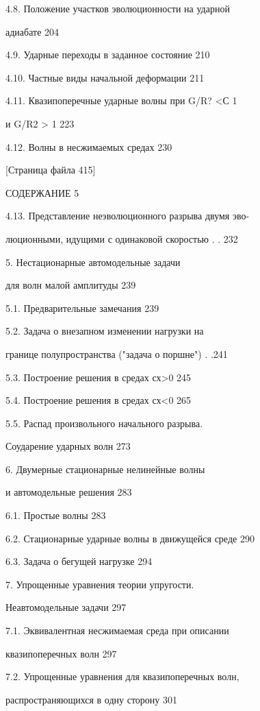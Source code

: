 \documentclass[
  11pt,
]{article}
\begin{document}
4.8. Положение участков эволюционности на ударной \par
адиабате 204 \par
4.9. Ударные переходы в заданное состояние 210 \par
4.10. Частные виды начальной деформации 211 \par
4.11. Квазипоперечные ударные волны при G/R? \textless С 1 \par
и G/R2 \textgreater{} 1 223 \par
4.12. Волны в несжимаемых средах 230 \par
\smallskip
\smallskip
\smallskip
{[}Страница файла 415{]}\par
СОДЕРЖАНИЕ 5 \par
4.13. Представление неэволюционного разрыва двумя эво- \par
люционными, идущими с одинаковой скоростью . . 232 \par
5. Нестационарные автомодельные задачи \par
для волн малой амплитуды 239 \par
5.1. Предварительные замечания 239 \par
5.2. Задача о внезапном изменении нагрузки на \par
границе полупространства ("задача о поршне") . .241 \par
5.3. Построение решения в средах сх\textgreater0 245 \par
5.4. Построение решения в средах сх\textless0 265 \par
5.5. Распад произвольного начального разрыва. \par
Соударение ударных волн 273 \par
6. Двумерные стационарные нелинейные волны \par
и автомодельные решения 283 \par
6.1. Простые волны 283 \par
6.2. Стационарные ударные волны в движущейся среде 290 \par
6.3. Задача о бегущей нагрузке 294 \par
7. Упрощенные уравнения теории упругости. \par
Неавтомодельные задачи 297 \par
7.1. Эквивалентная несжимаемая среда при описании \par
квазипоперечных волн 297 \par
7.2. Упрощенные уравнения для квазипоперечных волн, \par
распространяющихся в одну сторону 301 \par
\end{document}
